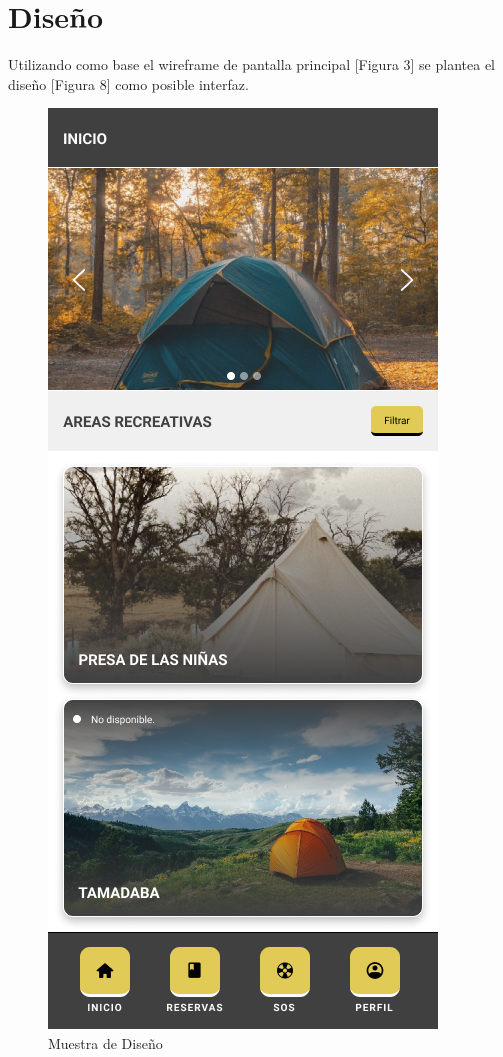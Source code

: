 \documentclass{scrartcl}
\begin{document}
    \section{Diseño}
        Utilizando como base el wireframe de pantalla principal [Figura 3] se
        plantea el diseño [Figura 8] como posible interfaz.
        \begin{figure}[H]
            \centerline{\includegraphics[scale=0.20]{design}}
            \caption{Muestra de Diseño}
            \label{fig:design}
        \end{figure}
\end{document}

